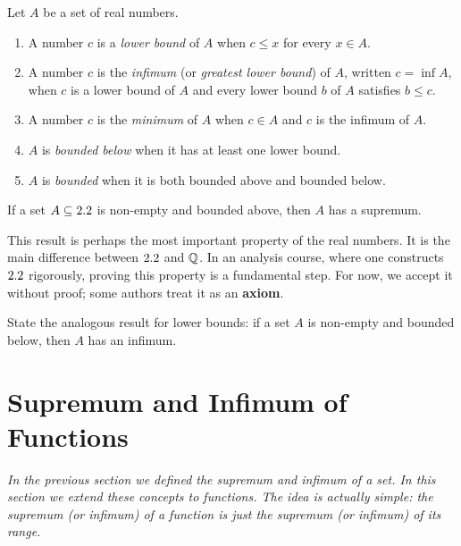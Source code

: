 \begin{definition}
\label{def:7-6}
Let $A$ be a set of real numbers.
\begin{enumerate}[label=(\roman*)]
  \item A number $c$ is a \emph{lower bound} of $A$ when $c \le x$ for every $x \in A$.
  \item A number $c$ is the \emph{infimum} (or \emph{greatest lower bound}) of $A$, written $c = \inf A$, when $c$ is a lower bound of $A$ and every lower bound $b$ of $A$ satisfies $b \le c$.
  \item A number $c$ is the \emph{minimum} of $A$ when $c \in A$ and $c$ is the infimum of $A$.
  \item $A$ is \emph{bounded below} when it has at least one lower bound.
  \item $A$ is \emph{bounded} when it is both bounded above and bounded below.
\end{enumerate}
\end{definition}

\begin{theorem}
\label{thm:7-2}
If a set $A \subseteq 2.2$ is non-empty and bounded above, then $A$ has a supremum.
\end{theorem}

\begin{remark}
This result is perhaps the most important property of the real numbers.  It is the main difference between $2.2$ and $\mathbb{Q}$.  In an analysis course, where one constructs $2.2$ rigorously, proving this property is a fundamental step.  For now, we accept it without proof; some authors treat it as an \textbf{axiom}.
\end{remark}

\begin{remark}
State the analogous result for lower bounds: if a set $A$ is non-empty and bounded below, then $A$ has an infimum.
\end{remark}

\section{Supremum and Infimum of Functions}
\label{sec:7.4}

\textit{In the previous section we defined the supremum and infimum of a set.  In this section we extend these concepts to functions.  The idea is actually simple: the supremum (or infimum) of a function is just the supremum (or infimum) of its range.}

